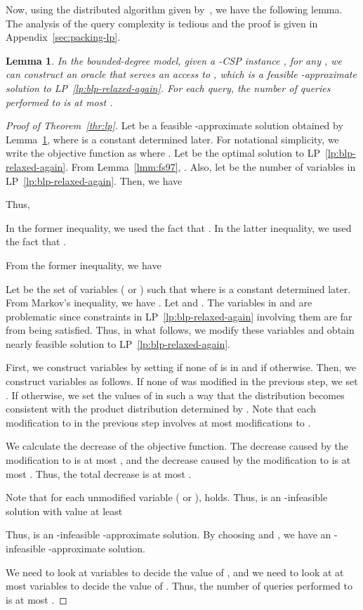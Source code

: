 \documentclass[letterpaper, 11pt]{article}
\newtheorem{lemma}[theorem]{Lemma}
\begin{document}
Now, using the distributed algorithm given by~\cite{KMW06}, 
we have the following lemma.
The analysis of the query complexity is tedious and the proof is given in Appendix~\ref{sec:packing-lp}.
\begin{lemma}\label{lmm:packing-lp}
  In the bounded-degree model,
  given a -CSP instance ,
  for any ,
  we can construct an oracle that serves an access to , 
  which is a feasible -approximate solution to LP~\eqref{lp:blp-relaxed-again}.
  For each query, the number of queries performed to  is at most .
\end{lemma}

\begin{proof}[Proof of Theorem~\ref{thr:lp}]
  Let  be a feasible -approximate solution obtained by Lemma~\ref{lmm:packing-lp},
  where  is a constant determined later.
  For notational simplicity,
  we write the objective function as  where .
  Let  be the optimal solution to LP~\eqref{lp:blp-relaxed-again}.
  From Lemma~\ref{lmm:fs97}, .
  Also, let  be the number of variables in LP~\eqref{lp:blp-relaxed-again}.
  Then, we have
  
  Thus,
  
  In the former inequality, we used the fact that .
  In the latter inequality, we used the fact that .

  From the former inequality, we have
  
  Let  be the set of variables  ( or ) such that  where  is a constant determined later.
  From Markov's inequality,
  we have .
  Let  and .
  The variables in  and  are problematic since constraints in LP~\eqref{lp:blp-relaxed-again} involving them are far from being satisfied.
  Thus, in what follows,
  we modify these variables and obtain nearly feasible solution to LP~\eqref{lp:blp-relaxed-again}.

  First, we construct variables  by setting  if none of  is in  and  if otherwise.
  Then, we construct variables  as follows.
  If none of  was modified in the previous step,
  we set .
  If otherwise, 
  we set the values of  in such a way that the distribution  becomes consistent with the product distribution determined by .
  Note that each modification to  in the previous step involves at most  modifications to .

  We calculate the decrease of the objective function.
  The decrease caused by the modification to  is at most ,
  and the decrease caused by the modification to  is at most .
  Thus, the total decrease is at most .
  
  Note that for each unmodified variable  ( or ), 
   holds.
  Thus,  is an -infeasible solution with value at least 
  
  Thus,  is an -infeasible -approximate solution.
  By choosing  and ,
  we have an -infeasible -approximate solution.

  We need to look at  variables  to decide the value of ,
  and we need to look at at most  variables  to decide the value of .
  Thus, the number of queries performed to  is at most 
  .
\end{proof}
\end{document}
